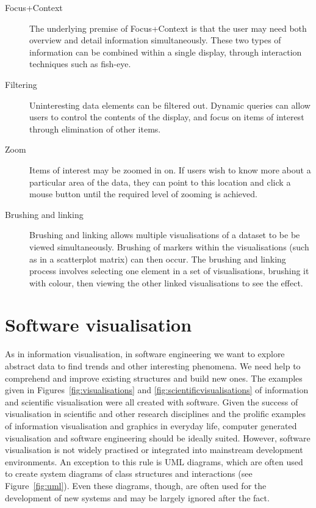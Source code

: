 \begin{description}
\item [Focus+Context] The underlying premise of Focus+Context is that the user may need both overview and detail information simultaneously. These two types of information can be combined within a single display, through interaction techniques such as fish-eye.

\item [Filtering] Uninteresting data elements can be filtered out. Dynamic queries can allow users to control the contents of the display, and focus on items of interest through elimination of other items.

\item [Zoom]  Items of interest may be zoomed in on. If users wish to know more about a particular area of the data, they can point to this location and click a mouse button until the required level of zooming is achieved.

\item [Brushing and linking] Brushing and linking allows multiple visualisations of a dataset to be be viewed simultaneously. Brushing of markers within the visualisations (such as in a scatterplot matrix) can then occur. The brushing and linking process involves selecting one element in a set of visualisations, brushing it with colour, then viewing the other linked visualisations to see the effect.

\end{description}

\section{Software visualisation}\label{sect:softvis}

As in information visualisation, in software engineering we want to explore abstract data to find trends and other interesting phenomena. We need help to comprehend and improve existing structures and build new ones. The examples given in Figures~\ref{fig:visualisations} and \ref{fig:scientificvisualisations} of information and scientific visualisation were all created with software. Given the success of visualisation in scientific and other research disciplines and the prolific examples of information visualisation and graphics in everyday life, computer generated visualisation and software engineering should be ideally suited. However, software visualisation is not widely practised or integrated into mainstream development environments.  An exception to this rule is UML diagrams, which are often used to create system diagrams of class structures and interactions (see Figure~\vref{fig:uml}). Even these diagrams, though, are often used for the development of new systems and may be largely ignored after the fact.

